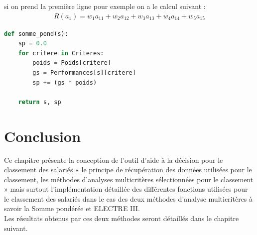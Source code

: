 si on prend la première ligne pour exemple on a le calcul suivant :
\begin{align*}
R(a_{1}) = w_{1}a_{11}+w_{2}a_{12}+w_{3}a_{13}+w_{4}a_{14}+w_{5}a_{15}
\end{align*}

\begin{lstlisting}[language=Python, frame=single, firstnumber=76]
def somme_pond(s):
    sp = 0.0
    for critere in Criteres:
        poids = Poids[critere]
        gs = Performances[s][critere]
        sp += (gs * poids)
        
    return s, sp
\end{lstlisting}

\section{Conclusion}
Ce chapitre présente la conception de l’outil d’aide à la décision pour le classement des salariés « le principe de récupération des données utilisées pour le classement, les méthodes d’analyses multicritères sélectionnées pour le classement » mais surtout l’implémentation détaillée des différentes fonctions utilisées pour le classement des salariés dans le cas des deux méthodes d’analyse multicritères à savoir la Somme pondérée et ELECTRE III.\\
Les résultats obtenus par ces deux méthodes seront détaillés dans le chapitre suivant. 
